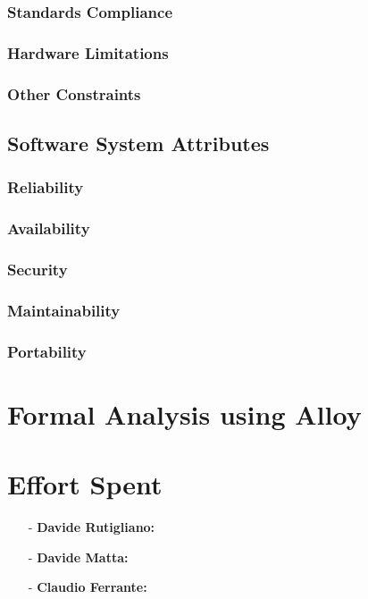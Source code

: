 \documentclass[a4paper]{article}
\begin{document}
        \subsubsection{Standards Compliance}
        
        \subsubsection{Hardware Limitations}
        
        \subsubsection{Other Constraints}
    
    \subsection{Software System Attributes}
        
        \subsubsection{Reliability}
        
        \subsubsection{Availability}
        
        \subsubsection{Security}
        
        \subsubsection{Maintainability}
        
        \subsubsection{Portability}
        
\newpage
\section{Formal Analysis using Alloy}

\newpage
\section{Effort Spent}
    \begin{itemize}
        \item[-] \textbf{Davide Rutigliano:}
        
        \item[-] \textbf{Davide Matta:}
        
        \item[-] \textbf{Claudio Ferrante:}
    \end{itemize}
\end{document}
